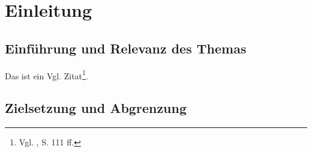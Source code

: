 \section{Einleitung}
\subsection{Einführung und Relevanz des Themas}
Das ist ein Vgl. Zitat\footnote{Vgl. \cite{Balzert2008}, S. 111 ff.}.
%

\subsection{Zielsetzung und Abgrenzung}


